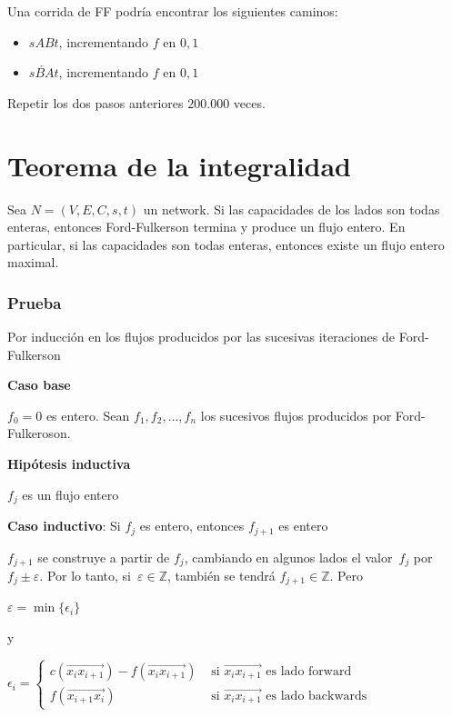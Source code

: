 \documentclass[10pt,a4paper]{article}
\begin{document}
Una corrida de FF podría encontrar los siguientes caminos:

\begin{itemize}

	\item $sABt$, incrementando $f$ en $0,1$
	\item $s\overleftarrow{BA}t$, incrementando $f$ en $0,1$
\end{itemize}

Repetir los dos pasos anteriores $200.000$ veces.

\section*{Teorema de la integralidad}

Sea $N = (V, E, C, s, t)$ un network. Si las capacidades de los lados son todas enteras, entonces Ford-Fulkerson termina y produce un flujo entero. En particular, si las capacidades son todas enteras, entonces existe un flujo entero maximal.

\subsubsection*{\textbf{Prueba}}

Por inducción en los flujos producidos por las sucesivas iteraciones de Ford-Fulkerson

\textbf{Caso base}

$f_0 = 0$ es entero. Sean $f_1, f_2, \dots, f_n$ los sucesivos flujos producidos por Ford-Fulkeroson.

\textbf{Hipótesis inductiva}

$f_j$ es un flujo entero

\textbf{Caso inductivo}: Si $f_j$ es entero, entonces $f_{j+1}$ es entero

$f_{j+1}$ se construye a partir de $f_j$, cambiando en algunos lados el valor $f_j$ por $f_j \pm \varepsilon$. Por lo tanto, si $\varepsilon \in \mathbb{Z}$, también se tendrá $f_{j+1} \in \mathbb{Z}$. Pero

\begin{center}
$\varepsilon = \min\{\epsilon_i\}$
\end{center}

y

\begin{center}
$\epsilon_i = \begin{cases} c(\overrightarrow{x_ix_{i+1}}) - f(\overrightarrow{x_ix_{i+1}}) & \text{ si } \overrightarrow{x_ix_{i+1}} \text{ es lado forward}\\ f(\overrightarrow{x_{i+1}x_i}) &\text{ si } \overrightarrow{x_ix_{i+1}} \text{ es lado backwards} \end{cases}$
\end{center}
\end{document}
